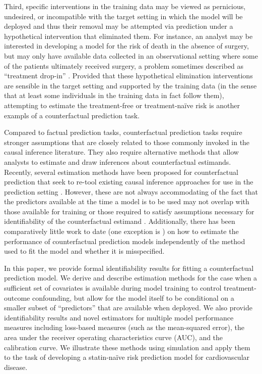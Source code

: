 Third, specific interventions in the training data may be viewed as pernicious, undesired, or incompatible with the target setting in which the model will be deployed and thus their removal may be attempted via prediction under a hypothetical intervention that eliminated them. For instance, an analyst may be interested in developing a model for the risk of death in the absence of surgery, but may only have available data collected in an observational setting where some of the patients ultimately received surgery, a problem sometimes described as ``treatment drop-in'' \cite{van_geloven_prediction_2020,sperrin_using_2018}. Provided that these hypothetical elimination interventions are sensible in the target setting and supported by the training data (in the sense that at least some individuals in the training data in fact follow them), attempting to estimate the treatment-free or treatment-na\"{i}ve risk is another exampls of a counterfactual prediction task.

Compared to factual prediction tasks, counterfactual prediction tasks require stronger assumptions that are closely related to those commonly invoked in the causal inference literature. They also require alternative methods that allow analysts to estimate and draw inferences about counterfactual estimands. Recently, several estimation methods have been proposed for counterfactual prediction that seek to re-tool existing causal inference approaches for use in the prediction setting \cite{lin_scoping_2021,sperrin_using_2018,dickerman_predicting_2022,schulam_reliable_2017-1}. However, these are not always accommodating of the fact that the predictors available at the time a model is to be used may not overlap with those available for training or those required to satisfy assumptions necessary for identifiability of the counterfactual estimand \cite{coston_counterfactual_2021}. Additionally, there has been comparatively little work to date (one exception is \textcite{coston_counterfactual_2020}) on how to estimate the performance of counterfactual prediction models independently of the method used to fit the model and whether it is misspecified. 

In this paper, we provide formal identifiability results for fitting a counterfactual prediction model. We derive and describe estimation methods for the case when a sufficient set of covariates is available during model training to control treatment-outcome confounding, but allow for the model itself to be conditional on a smaller subset of ``predictors'' that are available when deployed. We also provide identifiability results and novel estimators for multiple model performance measures including loss-based measures (such as the mean-squared error), the area under the receiver operating characteristics curve (AUC), and the calibration curve. We illustrate these methods using simulation and apply them to the task of developing a statin-na\"{i}ve risk prediction model for cardiovascular disease.

